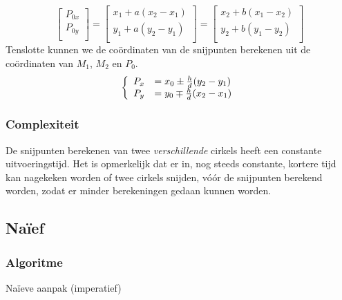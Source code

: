 \[
\begin{bmatrix}
P_{0x}\\P_{0y}\\
\end{bmatrix}
=
\begin{bmatrix}
x_1 + a(x_2-x_1)\\
y_1 + a(y_2-y_1)\\
\end{bmatrix}
=
\begin{bmatrix}
x_2 + b(x_1-x_2)\\
y_2 + b(y_1-y_2)\\
\end{bmatrix}
\]
Tenslotte kunnen we de co\"ordinaten van de snijpunten berekenen uit de co\"ordinaten van $M_1$, $M_2$ en $P_0$.
\[
\left\{
\begin{array}{c l}
P_x &= x_0 \pm \frac{h}{d}(y_2-y_1)\\
P_y &= y_0 \mp \frac{h}{d}(x_2-x_1)
\end{array}
\right.
\]

\subsubsection{Complexiteit}
De snijpunten berekenen van twee \emph{verschillende} cirkels heeft een constante uitvoeringstijd. Het is opmerkelijk dat er in, nog steeds constante, kortere tijd kan nagekeken worden of twee cirkels snijden, v\'o\'or de snijpunten berekend worden, zodat er minder berekeningen gedaan kunnen worden.


\subsection{Na\"ief}
\label{sec:naief}

\subsubsection{Algoritme}

\begin{algorithm}[H]
  \SetAlgoLined
  \caption{Na\"ieve aanpak (imperatief)}
  \label{algo:naive}
\end{algorithm}

